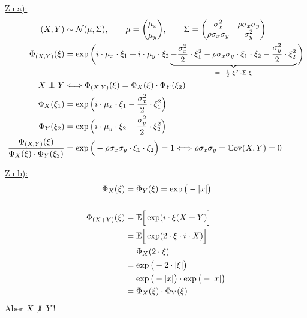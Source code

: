 \documentclass[12pt,a4paper]{article}
\begin{document}
\begin{lösung}
	\underline{Zu a):}
		\begin{align*}
		(X,Y)&\sim\mathcal{N}(\mu,\Sigma),\qquad\mu=\binom{\mu_x}{\mu_y},\qquad\Sigma=\begin{pmatrix}
			\sigma_x^2 & \rho\sigma_x\sigma_y\\
			\rho\sigma_x\sigma_y & \sigma_y^2
		\end{pmatrix}\\
		\Phi_{(X,Y)}(\xi)
		&=\exp\bigg(i\cdot\mu_x\cdot\xi_1+i\cdot\mu_y\cdot\xi_2\underbrace{-\frac{\sigma_x^2}{2}\cdot\xi_1^2-\rho\sigma_x\sigma_y\cdot\xi_1\cdot\xi_2-\frac{\sigma_y^2}{2}\cdot\xi_2^2}_{=-\frac{1}{2}\cdot\xi^T\cdot\Sigma\cdot\xi}\bigg)\\
		X\unab Y &\Longleftrightarrow\Phi_{(X,Y)}(\xi)=\Phi_X(\xi)\cdot\Phi_Y(\xi_2)\\
		\Phi_X(\xi_1)&=\exp\Big(i\cdot\mu_x\cdot\xi_1-\frac{\sigma_x^2}{2}\cdot\xi_1^2\Big)\\
		\Phi_Y(\xi_2)&=\exp\Big(i\cdot\mu_y\cdot\xi_2-\frac{\sigma_y^2}{2}\cdot\xi_2^2\Big)\\
		\frac{\Phi_{(X,Y)}(\xi)}{\Phi_X(\xi)\cdot\Phi_Y(\xi_2)}
		&=\exp\Big(-\rho\sigma_x\sigma_y\cdot\xi_1\cdot\xi_2\Big)=1
		\Longleftrightarrow\rho\sigma_x\sigma_y=\Cov(X,Y)=0
	\end{align*}	
		
	\underline{Zu b):}
	\begin{align*}
		\Phi_X(\xi)&=\Phi_Y(\xi)=\exp\big(-|x|\big)\nl
		\Phi_{(X+Y)}(\xi)
		&=\E\Big[\exp(i\cdot\xi(X+Y)\Big]\\
		&=\E\Big[\exp(2\cdot\xi\cdot i\cdot X)\Big]\\
		&=\Phi_X(2\cdot\xi)\\
		&=\exp\big(-2\cdot|\xi|\big)\\
		&=\exp\big(-|x|\big)\cdot\exp\big(-|x|\big)\\
		&=\Phi_X(\xi)\cdot\Phi_Y(\xi)
	\end{align*}
	Aber $X\not\unab Y$!
	\end{lösung}
\end{document}
